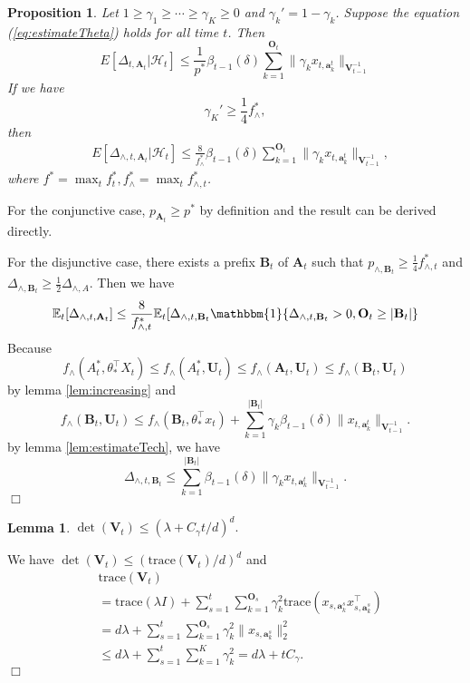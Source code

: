 \documentclass{article}
\newcommand{\EE}{\mathbb{E}}
\newcommand{\bOne}{\mathbbm{1}}
\newcommand{\bA}{\mathbf{A}}
\newcommand{\ba}{\mathbf{a}}
\newcommand{\bB}{\mathbf{B}}
\newcommand{\bO}{\mathbf{O}}
\newcommand{\bU}{\mathbf{U}}
\newcommand{\bV}{\mathbf{V}}
\newcommand{\cH}{\mathcal{H}}
\newcommand{\trace}{\mathrm{trace}}
\newcommand{\abs}[1]{\left| #1 \right|}
\newcommand{\norm}[1]{\| #1 \|}
\newtheorem{proposition}[theorem]{Proposition}%
\newtheorem{lemma}[theorem]{Lemma}%
\newenvironment{proof}{\noindent {\textbf{Proof. }}}{$\Box$ \medskip}
\begin{document}
\begin{proposition}
Let $1 \geq \gamma_1 \geq \cdots \geq \gamma_K \geq 0$ and $\gamma_k' = 1 - \gamma_k$. Suppose the equation (\ref{eq:estimateTheta}) holds for all time $t$. Then
$$
E[\Delta_{t, \bA_t}|\cH_t] \leq \frac{1}{p^*} \beta_{t-1}(\delta)\sum_{k=1}^{\bO_t}\norm{\gamma_k x_{t,\ba_k^t}}_{\bV_{t-1}^{-1}}
$$
If we have
$$
\gamma_K' \geq \frac{1}{4} f_{\wedge}^{\ast},
$$
then
\begin{align*}
&E[\Delta_{\wedge, t, \bA_t}|\cH_t] \leq \frac{8}{f_{\wedge}^{\ast}} \beta_{t-1}(\delta)\sum_{k=1}^{\bO_t}\norm{\gamma_k x_{t,\ba_k^t}}_{\bV_{t-1}^{-1}},
\end{align*}
where $f^{\ast} = \max_{t} f_t^{\ast}, f_{\wedge}^{\ast} = \max_{t} f_{\wedge, t}^{\ast}$.
\end{proposition}
\begin{proof}
For the conjunctive case,  $p_{\bA_t} \geq p^*$ by definition and the result can be derived directly.

For the disjunctive case, there exists a prefix $\bB_t$ of $\bA_t$ such that $p_{\wedge, \bB_t} \geq \frac{1}{4}f_{\wedge, t}^*$ and $\Delta_{\wedge, \bB_t} \geq \frac{1}{2}\Delta_{\wedge, A}$. Then we have
$$
\EE_t[\Delta_{\wedge, t, \bA_t}] \leq \frac{8}{f_{\wedge, t}^*} \EE_t[\Delta_{\wedge, t, \bB_t} \bOne\{\Delta_{\wedge, t, \bB_t} > 0, \bO_t \geq \abs{\bB_t}\}
$$
Because 
$$
f_{\wedge}(A_t^*, \theta_*^{\top}X_t) \leq f_{\wedge}(A_t^*,\bU_t) \leq f_{\wedge}(\bA_t,\bU_t) \leq f_{\wedge}(\bB_t,\bU_t)
$$
by lemma \ref{lem:increasing} and
$$
f_{\wedge}(\bB_t,\bU_t) \leq f_{\wedge}(\bB_t, \theta_*^{\top}x_t) + \sum_{k=1}^{\abs{\bB_t}}\gamma_k\beta_{t-1}(\delta)\norm{x_{t,\ba_k^t}}_{\bV_{t-1}^{-1}}.
$$
by lemma \ref{lem:estimateTech}, we have
$$
\Delta_{\wedge, t, \bB_t} \leq \sum_{k=1}^{\abs{\bB_t}}\beta_{t-1}(\delta)\norm{\gamma_k x_{t,\ba_k^t}}_{\bV_{t-1}^{-1}}.
$$
\end{proof}
	
\begin{lemma} %
$\det(\bV_t) \leq (\lambda + C_\gamma t/d)^d.$
\end{lemma}
\begin{proof}
We have $\det(\bV_t) \leq (\trace(\bV_t)/d)^d$ and
\begin{align*}
&\trace(\bV_t)\\
& = \trace(\lambda I) + \sum_{s=1}^t \sum_{k=1}^{\bO_s} \gamma_k^2 \trace(x_{s,\ba_k^s} x_{s,\ba_k^s}^{\top})\\	
& = d \lambda + \sum_{s=1}^t \sum_{k=1}^{\bO_s} \gamma_k^2 \norm{x_{s,\ba_k^s}}_2^2\\
& \leq d \lambda + \sum_{s=1}^t\sum_{k=1}^{K}\gamma_k^2 = d \lambda + t C_\gamma.
\end{align*}
\end{proof}
\end{document}
